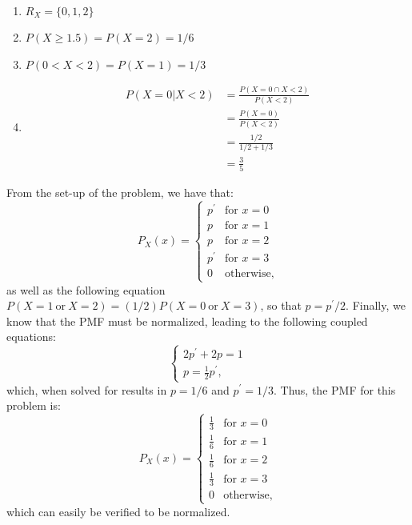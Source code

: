 


\begin{problem}{1} $ $

	\begin{enumerate}
	
	\item
		$R_X = \{0, 1, 2 \}$
		
	\item
		$P(X \ge 1.5) = P(X=2) = 1/6$
		
	\item
		$P(0<X<2) = P(X=1) = 1/3$
		
	\item
		\begin{align*}
			P(X=0|X<2) & = \frac{P(X=0 \cap X <2)}{P(X<2)} \\
			& = \frac{P(X=0)}{P(X<2)} \\
			& = \frac{1/2}{1/2+1/3} \\
			& = \frac{3}{5}
		\end{align*}

	\end{enumerate}
\end{problem}
	
\begin{problem}{2} From the set-up of the problem, we have that:
\[
  P_X(x) =
  \begin{cases}
                                   p^{\prime} & \text{for $x=0$} \\
                                   p & \text{for $x=1$} \\
                                   p & \text{for $x=2$} \\
                                   p^\prime & \text{for $x=3$} \\
                                   0 & \text{otherwise},
  \end{cases}
\]
as well as the following equation $P(X=1~\mathrm{or}~X=2) =(1/2)P(X=0~\mathrm{or}~X=3)$, so that $p=p^\prime/2$.  Finally, we know that the PMF must be normalized, leading to the following coupled equations:
\[
  \begin{cases}
                                   2p^{\prime}+2p=1\\
                                   p=\frac{1}{2}p^\prime,
  \end{cases}
\]
which, when solved for results in $p=1/6$ and $p^\prime=1/3$.  Thus, the PMF for this problem is:
  \[
  P_X(x) =
  \begin{cases}
                                   \frac{1}{3} & \text{for $x=0$} \\
                                    \frac{1}{6} & \text{for $x=1$} \\
                                    \frac{1}{6} & \text{for $x=2$} \\
                                    \frac{1}{3} & \text{for $x=3$} \\
                                   0 & \text{otherwise},
  \end{cases}
\]
which can easily be verified to be normalized.

\end{problem}

